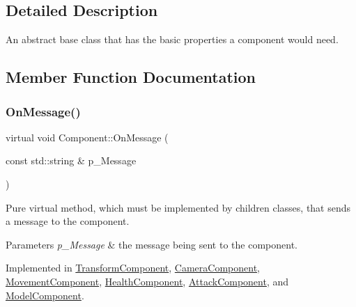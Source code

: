\subsection{Detailed Description}
An abstract base class that has the basic properties a component would need. 

\subsection{Member Function Documentation}
\mbox{\label{class_component_a1cd106256bf1791f9c6ab347776c7788}} 
\subsubsection{\texorpdfstring{OnMessage()}{OnMessage()}}
{\footnotesize\ttfamily virtual void Component\+::\+On\+Message (\begin{DoxyParamCaption}\item[{const std\+::string \&}]{p\+\_\+\+Message }\end{DoxyParamCaption})\hspace{0.3cm}{\ttfamily [pure virtual]}}



Pure virtual method, which must be implemented by children classes, that sends a message to the component. 


\begin{DoxyParams}{Parameters}
{\em p\+\_\+\+Message} & the message being sent to the component. \\
\hline
\end{DoxyParams}


Implemented in \mbox{\hyperlink{class_transform_component_a07510e9014663febd69f9c00666a3951}{Transform\+Component}}, \mbox{\hyperlink{class_camera_component_aa4c591ae0309634d43d7cee341eb6abf}{Camera\+Component}}, \mbox{\hyperlink{class_movement_component_aa82c5ab1af1d6bf286f264ad760e1e30}{Movement\+Component}}, \mbox{\hyperlink{class_health_component_aaaf08f6e3535e5cf0e94bddff815c11f}{Health\+Component}}, \mbox{\hyperlink{class_attack_component_a25a304233ac871cfec61b6cc744b10bb}{Attack\+Component}}, and \mbox{\hyperlink{class_model_component_aff7bfde1544e8e608e55680706321fac}{Model\+Component}}.

\mbox{\label{class_component_ac080e9fa054949464c796b65a4b26b93}} 
